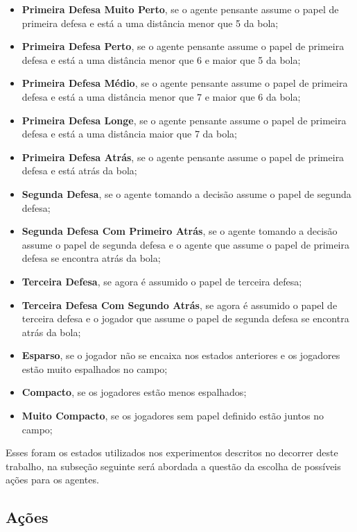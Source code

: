 \begin{itemize}
    \item \textbf{Primeira Defesa Muito Perto}, se o agente pensante assume o
    papel de primeira defesa e está a uma distância menor que 5 da bola;
    \item \textbf{Primeira Defesa Perto}, se o agente pensante assume o papel de
    primeira defesa e está a uma distância menor que 6 e maior que 5 da bola;
    \item \textbf{Primeira Defesa Médio}, se o agente pensante assume o papel de
    primeira defesa e está a uma distância menor que 7 e maior que 6 da bola;
    \item \textbf{Primeira Defesa Longe}, se o agente pensante assume o papel de
    primeira defesa e está a uma distância maior que 7 da bola;
    \item \textbf{Primeira Defesa Atrás}, se o agente pensante assume o papel de
    primeira defesa e está atrás da bola;
    \item  \textbf{Segunda Defesa}, se o agente tomando a decisão assume o papel
    de segunda defesa;
    \item  \textbf{Segunda Defesa Com Primeiro Atrás}, se o agente tomando a
    decisão assume o papel de segunda defesa e o agente que assume o papel de
    primeira defesa se encontra atrás da bola;
    \item \textbf{Terceira Defesa}, se agora é assumido o papel de terceira
    defesa;
    \item \textbf{Terceira Defesa Com Segundo Atrás}, se agora é assumido o
    papel de terceira defesa e o jogador que assume o papel de segunda defesa se
    encontra atrás da bola;
    \item \textbf{Esparso}, se o jogador não se encaixa nos estados anteriores e
    os jogadores estão muito espalhados no campo;
    \item \textbf{Compacto}, se os jogadores estão menos espalhados;
    \item \textbf{Muito Compacto}, se os jogadores sem papel definido estão
    juntos no campo;
\end{itemize}

Esses foram os estados utilizados nos experimentos descritos no decorrer deste
trabalho, na subseção seguinte será abordada a questão da escolha de possíveis
ações para os agentes.

\subsection{Ações}\label{actions}

